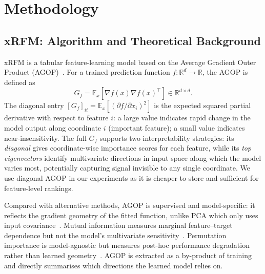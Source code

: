 
\section{Methodology}

\subsection{xRFM: Algorithm and Theoretical Background}

xRFM is a tabular feature-learning model based on the Average Gradient Outer Product (AGOP)~\citep{beaglehole2025xrfm,radhakrishnan2024mechanism}. For a trained prediction function $f:\mathbb{R}^{d}\rightarrow\mathbb{R}$, the AGOP is defined as
\begin{equation}
    G_f=\mathbb{E}_{x}\!\left[\nabla f(x)\nabla f(x)^{\top}\right] \in \mathbb{R}^{d\times d}.
    \label{eq:agop}
\end{equation}
The diagonal entry $[G_f]_{ii}=\mathbb{E}_x[(\partial f/\partial x_i)^2]$ is the expected squared partial derivative with respect to feature $i$: a large value indicates rapid change in the model output along coordinate $i$ (important feature); a small value indicates near-insensitivity. The full $G_f$ supports two interpretability strategies: its \emph{diagonal} gives coordinate-wise importance scores for each feature, while its \emph{top eigenvectors} identify multivariate directions in input space along which the model varies most, potentially capturing signal invisible to any single coordinate. We use diagonal AGOP in our experiments as it is cheaper to store and sufficient for feature-level rankings.

Compared with alternative methods, AGOP is supervised and model-specific: it reflects the gradient geometry of the fitted function, unlike PCA which only uses input covariance~\citep{pearson1901pca}. Mutual information measures marginal feature–target dependence but not the model's multivariate sensitivity~\citep{kraskov2004estimating}. Permutation importance is model-agnostic but measures post-hoc performance degradation rather than learned geometry~\citep{fisher2019all}. AGOP is extracted as a by-product of training and directly summarises which directions the learned model relies on.

